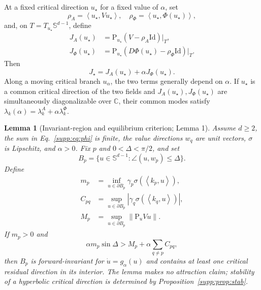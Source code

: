\documentclass[11pt]{article}
\newtheorem{lemma}{Lemma}
\newcommand{\Sph}{\mathbb{S}}
\newcommand{\norm}[1]{\left\lVert #1 \right\rVert}
\newcommand{\ip}[2]{\left\langle #1,#2 \right\rangle}
\newcommand{\Proj}{\mathrm{P}}
\newcommand{\id}{\mathrm{Id}}
\begin{document}
At a fixed critical direction $u_\star$ for a fixed value of $\alpha$, set
\begin{equation}
\rho_A=\ip{u_\star}{Vu_\star},\quad
\rho_\Phi=\ip{u_\star}{\Phi(u_\star)},
\end{equation}
and, on $T=T_{u_\star}\Sph^{d-1}$, define
\begin{equation}
\begin{split}
J_A(u_\star)&=\Proj_{u_\star}(V-\rho_A\id)|_T,
\\
J_\Phi(u_\star)&=\Proj_{u_\star}(D\Phi(u_\star)-\rho_\Phi\id)|_T.
\end{split}
\end{equation}
Then
\begin{equation}
J_\star=J_A(u_\star)+\alpha J_\Phi(u_\star).
\label{eq:spectral-decomp}
\end{equation}
Along a moving critical branch $u_\alpha$, the two terms generally depend on
$\alpha$. If $u_\star$ is a common critical direction of the two fields and
$J_A(u_\star),J_\Phi(u_\star)$ are simultaneously diagonalizable over
$\mathbb C$, their common modes satisfy
$\lambda_k(\alpha)=\lambda_k^A+\alpha\lambda_k^\Phi$.



\begin{lemma}[Invariant-region and equilibrium criterion; Lemma 1]\label{supp:lem:basin}
Assume $d\ge2$, the sum in Eq.~\eqref{supp:eq:phi} is finite, the value directions $w_q$ are
unit vectors, $\sigma$ is Lipschitz, and $\alpha>0$. Fix $p$ and
$0<\Delta<\pi/2$, and set
\begin{equation}
B_p=\{u\in\Sph^{d-1}:\angle(u,w_p)\le\Delta\}.
\end{equation}
Define
\begin{equation}
\begin{split}
m_p&=\inf_{u\in\partial B_p}\gamma_p\sigma(\ip{k_p}{u}),\\
C_{pq}&=\sup_{u\in\partial B_p}|\gamma_q\sigma(\ip{k_q}{u})|,\\
M_p&=\sup_{u\in\partial B_p}\norm{\Proj_uVu}.
\end{split}
\end{equation}
If $m_p>0$ and
\begin{equation}
\alpha m_p\sin\Delta>M_p+\alpha\sum_{q\ne p}C_{pq},
\label{supp:eq:inward}
\end{equation}
then $B_p$ is forward-invariant for $\dot u=g_\alpha(u)$ and contains at least
one critical residual direction in its interior. The lemma makes no attraction
claim; stability of a hyperbolic critical direction is determined by
Proposition~\ref{supp:prop:stab}.
\end{lemma}
\end{document}
